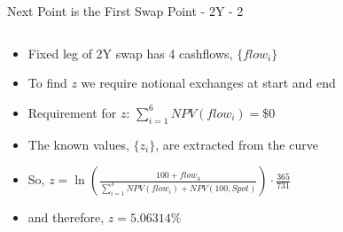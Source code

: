 \documentclass[handout, aspectratio=169]{beamer}
\begin{document}
\begin{frame}{Next Point is the First Swap Point - 2Y - 2}
\begin{columns}[T]
		\begin{column}{0.7\textwidth}
			\small
			\begin{itemize}
				\item Fixed leg of 2Y swap has 4 cashflows, $\{flow_i\}$
				\item To find $z$ we require notional exchanges at start and end
				\item Requirement for $z$: $\sum_{i=1}^{6} NPV(flow_i) = \$0$
				\item The known values, $\{z_i\}$, are extracted from the curve
				\item So, $z = \ln(\frac{100+flow_4}{\sum_{i=1}^{3} NPV(flow_i)+NPV(100, Spot)}) \cdot \frac{365}{731}$
				\item and therefore, $z = 5.06314\%$
			\end{itemize}
		\end{column}
	\end{columns}
\end{frame}
\end{document}
